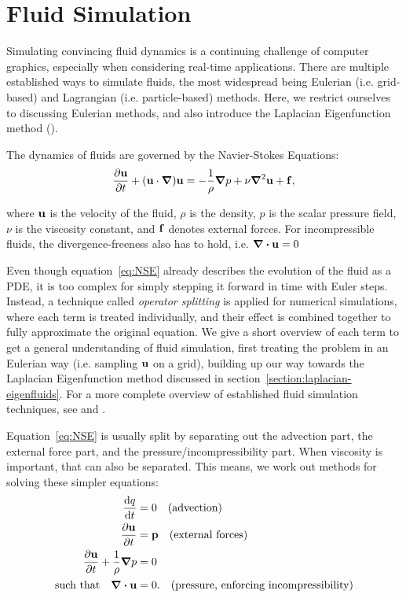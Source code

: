 \chapter{Fluid Simulation}
Simulating convincing fluid dynamics is a continuing challenge of computer
graphics, especially when considering real-time applications. There are multiple
established ways to simulate fluids, the most widespread being Eulerian (i.e.
grid-based) and Lagrangian (i.e. particle-based) methods. Here, we restrict
ourselves to discussing Eulerian methods, and also introduce the Laplacian
Eigenfunction method (\cite{dewitt}).

The dynamics of fluids are governed by the Navier-Stokes Equations:
\begin{equation}\label{eq:NSE}
    \pdv{\vb{u}}{t} + (\vb{u}\cdot\grad)\vb{u}
    = -\frac{1}{\rho}\grad{p} + \nu\grad^2\vb{u} + \vb{f},
\end{equation}

where $\vb{u}$ is the velocity of the fluid, $\rho$ is the density, $p$ is the
scalar pressure field, $\nu$ is the viscosity constant, and $\vb{f}$ denotes
external forces. For incompressible fluids, the divergence-freeness also has to
hold, i.e. $\div{\vb{u}} = 0$

Even though equation~\eqref{eq:NSE} already describes the evolution of the fluid
as a \acf{PDE}, it is too complex for simply stepping it forward in time with
Euler steps. Instead, a technique called \textit{operator splitting} is applied
for numerical simulations, where each term is treated individually, and their
effect is combined together to fully approximate the original equation. We give
a short overview of each term to get a general understanding of fluid
simulation, first treating the problem in an Eulerian way (i.e.  sampling
$\vb{u}$ on a grid), building up our way towards the Laplacian Eigenfunction
method discussed in section~\ref{section:laplacian-eigenfluids}.  For a more
complete overview of established fluid simulation techniques, see
\cite{FluidNotes} and \cite{BridsonFluid}.

Equation~\eqref{eq:NSE} is usually split by separating out the advection part,
the external force part, and the pressure/incompressibility part. When viscosity
is important, that can also be separated. This means, we work out methods for
solving these simpler equations:
\begin{align*}
    \dv{q}{t} &= 0              \qq{(advection)}\\
    \pdv{\vb{u}}{t} &= \vb{p}   \qq{(external forces)}\\
    \pdv{\vb{u}}{t} + \frac{1}{\rho}\grad p &= 0 \\
    \qq{such that}\div{\vb{u}} &= 0.
                                \qq{(pressure, enforcing incompressibility)}
\end{align*}

